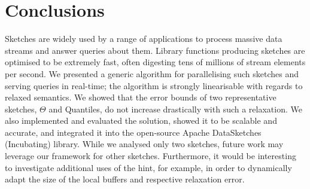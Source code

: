 \section{Conclusions}
\label{sec:discussion}

Sketches are widely used by a range of applications
to process massive data streams and answer queries about them.
Library functions producing sketches
are optimised to be extremely fast, often digesting tens of millions of stream elements per second. 
We presented a generic algorithm for parallelising such sketches and serving
queries in real-time; the algorithm is strongly linearisable with regards to relaxed semantics.
We showed that the error bounds of two representative sketches,
$\Theta$ and Quantiles, do not increase drastically with such a relaxation. We also
implemented and evaluated the solution, showed it to be scalable {and accurate}, and integrated it into
the open-source Apache DataSketches (Incubating) library. While we analysed only two sketches, future work
may leverage our framework for other sketches. Furthermore, it would be interesting to investigate
additional uses of the hint, for example, in order to dynamically adapt the size of the local buffers
and respective relaxation error.